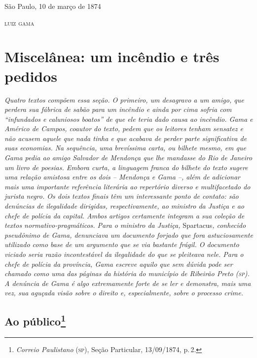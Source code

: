 \begin{flushright}
São Paulo, 10 de março de 1874

\textsc{luiz gama}
\end{flushright}

\part{Miscelânea: um incêndio e três pedidos}

\begin{argumento}
\emph{Quatro textos compõem essa seção. O primeiro, um desagravo a um
amigo, que perdera sua fábrica de sabão para um incêndio e ainda por
cima sofria com ``infundados e caluniosos boatos'' de que ele teria dado
causa ao incêndio. Gama e Américo de Campos, coautor do texto, pedem que
os leitores tenham sensatez e não acusem aquele que nada tinha e que
acabava de perder parte significativa de suas economias. Na sequência,
uma brevíssima carta, ou bilhete mesmo, em que Gama pedia ao amigo
Salvador de Mendonça que lhe mandasse do Rio de Janeiro um livro de
poesias. Embora curta, a linguagem franca do bilhete do texto sugere uma
relação amistosa entre os dois -- Mendonça e Gama --, além de adicionar
mais uma importante referência literária ao repertório diverso e
multifacetado do jurista negro. Os dois textos finais têm um
interessante ponto de contato: são denúncias de ilegalidade dirigidas,
respectivamente, ao ministro da Justiça e ao chefe de polícia da
capital. Ambos artigos certamente integram a sua coleção de textos
normativo-pragmáticos. Para o ministro da Justiça,} Spartacus\emph{,
conhecido pseudônimo de Gama, denunciava um documento forjado que fora
astuciosamente utilizado como base de um argumento que se via bastante
frágil. O documento viciado seria razão incontestável da ilegalidade do
que se pleiteava nele. Para o chefe de polícia da província, Gama
escreve aquilo que sem dúvida pode ser chamado como uma das páginas da
história do município de Ribeirão Preto (\textsc{sp}). A denúncia de Gama é algo
extremamente forte de se ler e demonstra, mais uma vez, sua aguçada
visão sobre o direito e, especialmente, sobre o processo crime.}
\end{argumento}

\chapter{Ao público\footnote{\emph{Correio Paulistano} (\textsc{sp}), Seção Particular,
  13/09/1874, p.\,2.}} %

